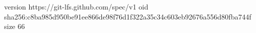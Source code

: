 version https://git-lfs.github.com/spec/v1
oid sha256:c8ba985d950be91ee866de98f76d1f322a35c34c603eb92676a556d80fba744f
size 66
